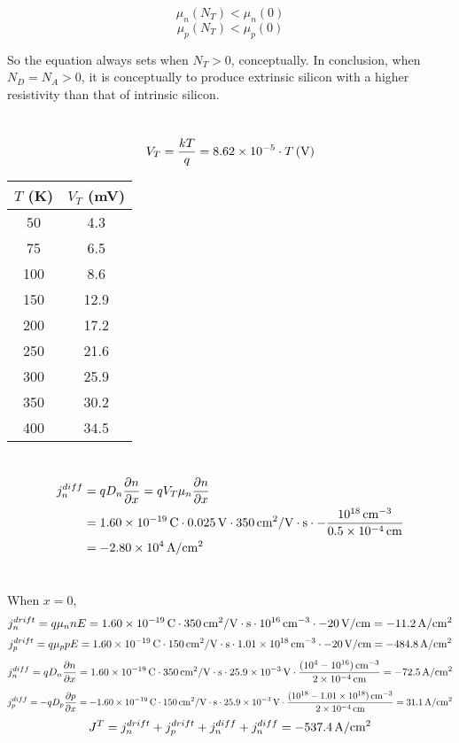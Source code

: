 \documentclass{article}
\newcommand{\unit}[1]{{\rm\,#1}}
\begin{document}
$$\mu_n(N_T)<\mu_n(0)$$
$$\mu_p(N_T)<\mu_p(0)$$

So the equation always sets when $N_T>0$, conceptually. In conclusion, when $N_D=N_A>0$, it is conceptually to produce extrinsic silicon with a higher resistivity than that of intrinsic silicon.

\section{}
$$V_T=\frac{kT}{q}=8.62\times10^{-5}\cdot T\unit{(V)}$$
\begin{center}
\begin{tabular}{|c|c|}
\hline
$T$ (K) & $V_T$ (mV) \\\hline
50 & 4.3\\\hline
75 & 6.5\\\hline
100 & 8.6\\\hline
150 & 12.9\\\hline
200 & 17.2\\\hline
250 & 21.6\\\hline
300 & 25.9\\\hline
350 & 30.2\\\hline
400 & 34.5\\\hline
\end{tabular}
\end{center}

\section{}
\begin{align*}
j_n^{diff}&=qD_n\frac{\partial n}{\partial x}=qV_T\mu_n\frac{\partial n}{\partial x}\\
&=1.60\times10^{-19}\unit{C}\cdot0.025\unit{V}\cdot350\unit{cm^2/V\cdot s}\cdot-\frac{10^{18}\unit{cm^{-3}}}{0.5\times10^{-4}\unit{cm}}\\
&=-2.80\times10^{4}\unit{A/cm^2}
\end{align*}


\section{}
When $x=0$,
$$j_n^{drift}=q\mu_nnE=1.60\times10^{-19}\unit{C}\cdot350\unit{cm^2/V\cdot s}\cdot10^{16}\unit{cm^{-3}}\cdot-20\unit{V/cm}=-11.2\unit{A/cm^2}$$
$$j_p^{drift}=q\mu_ppE=1.60\times10^{-19}\unit{C}\cdot150\unit{cm^2/V\cdot s}\cdot1.01\times10^{18}\unit{cm^{-3}}\cdot-20\unit{V/cm}=-484.8\unit{A/cm^2}$$
$$j_n^{diff}=qD_n\frac{\partial n}{\partial x}=1.60\times10^{-19}\unit{C}\cdot350\unit{cm^2/V\cdot s}\cdot25.9\times10^{-3}\unit{V}\cdot\frac{(10^4-10^{16})\unit{cm^{-3}}}{2\times10^{-4}\unit{cm}}=-72.5\unit{A/cm^2}$$
$$j_p^{diff}=-qD_p\frac{\partial p}{\partial x}=-1.60\times10^{-19}\unit{C}\cdot150\unit{cm^2/V\cdot s}\cdot25.9\times10^{-3}\unit{V}\cdot\frac{(10^{18}-1.01\times10^{18})\unit{cm^{-3}}}{2\times10^{-4}\unit{cm}}=31.1\unit{A/cm^2}$$
$$J^T=j_n^{drift}+j_p^{drift}+j_n^{diff}+j_n^{diff}=-537.4\unit{A/cm^2}$$
\end{document}
